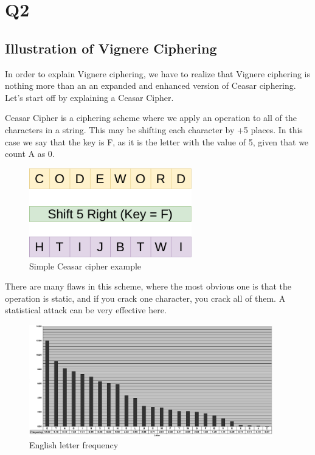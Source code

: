 \documentclass{article}
\begin{document}
\section{Q2}
\subsection{Illustration of Vignere Ciphering}

In order to explain Vignere ciphering, we have to realize that Vignere ciphering is nothing more than an an expanded and enhanced version of Ceasar ciphering. Let's start off by explaining a Ceasar Cipher. 

Ceasar Cipher is a ciphering scheme where we apply an operation to all of the characters in a string. This may be shifting each character by +5 places. In this case we say that the key is F, as it is the letter with the value of 5, given that we count A as 0.

\begin{figure}[H]
 \centering
  \includegraphics[width=200pt]{img/ceasar.png}
 \caption{Simple Ceasar cipher example}
 \end{figure}

There are many flaws in this scheme, where the most obvious one is that the operation is static, and if you crack one character, you crack all of them. A statistical attack can be very effective here.

\begin{figure}[H]
 \centering
  \includegraphics[width=300pt]{img/frequency.jpg}
 \caption{English letter frequency\cite{LETTER}}
 \end{figure}
\end{document}
